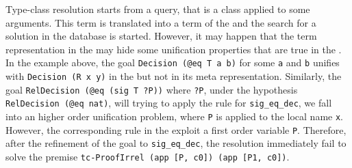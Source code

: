 \documentclass{rapport}
\begin{document}
Type-class resolution starts from a query, that is a class applied to some
arguments. This \coq term is translated into a term of the \ml and the search
for a solution in the database is started. However, it may happen that the term
representation in the \ml may hide some unification properties that are true in
the \ol. In the example above, the goal \texttt{Decision (@eq T a b)} for some
\texttt{a} and \texttt{b} unifies with \texttt{Decision (R x y)} in the \ol but
not in its meta representation. Similarly, the goal \texttt{RelDecision (@eq
(sig T ?P))} where \texttt{?P}, under the hypothesis \texttt{RelDecision (@eq
nat)}, will trying to apply the rule for \texttt{sig\_eq\_dec}, we fall into an
higher order unification problem, where \texttt{P} is applied to the local name
\texttt{x}. However, the corresponding rule in the \ml exploit a first order
variable \texttt{P}. Therefore, after the refinement of the goal to
\texttt{sig\_eq\_dec}, the resolution immediately fail to solve the premise
\texttt{tc-ProofIrrel (app [P, c0]) (app [P1, c0])}.
\end{document}
